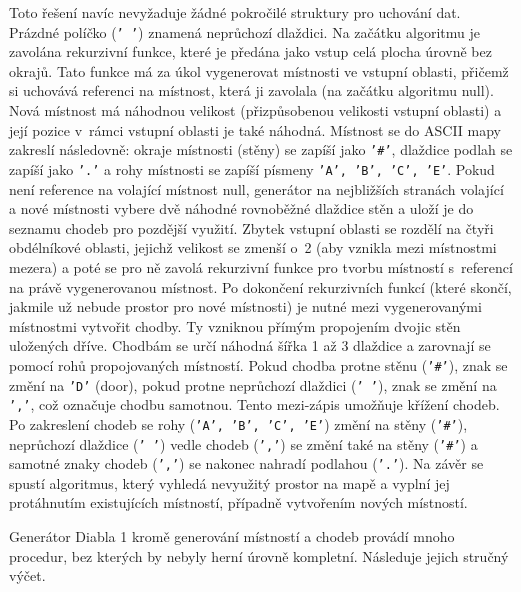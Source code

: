 Toto řešení navíc nevyžaduje žádné pokročilé struktury pro uchování dat.
Prázdné políčko (\texttt{' '}) znamená neprůchozí dlaždici.
Na začátku algoritmu je zavolána rekurzivní funkce, které je předána jako vstup celá plocha úrovně bez okrajů.
Tato funkce má za úkol vygenerovat místnosti ve vstupní oblasti, přičemž si uchovává referenci na místnost, která ji zavolala (na začátku algoritmu null).
Nová místnost má náhodnou velikost (přizpůsobenou velikosti vstupní oblasti) a její pozice v~rámci vstupní oblasti je také náhodná.
Místnost se do ASCII mapy zakreslí následovně: okraje místnosti (stěny) se zapíší jako \texttt{'\#'}, dlaždice podlah se zapíší jako \texttt{'.'} a rohy místnosti se zapíší písmeny \texttt{'A', 'B', 'C', 'E'}.
Pokud není reference na volající místnost null, generátor na nejbližších stranách volající a nové místnosti vybere dvě náhodné rovnoběžné dlaždice stěn a uloží je do seznamu chodeb pro pozdější využití.
Zbytek vstupní oblasti se rozdělí na čtyři obdélníkové oblasti, jejichž velikost se zmenší o~2 (aby vznikla mezi místnostmi mezera) a poté se pro ně zavolá rekurzivní funkce pro tvorbu místností s~referencí na právě vygenerovanou místnost.
Po dokončení rekurzivních funkcí (které skončí, jakmile už nebude prostor pro nové místnosti) je nutné mezi vygenerovanými místnostmi vytvořit chodby.
Ty vzniknou přímým propojením dvojic stěn uložených dříve.
Chodbám se určí náhodná šířka 1 až 3 dlaždice a zarovnají se pomocí rohů propojovaných místností.
Pokud chodba protne stěnu (\texttt{'\#'}), znak se změní na \texttt{'D'} (door), pokud protne neprůchozí dlaždici (\texttt{' '}), znak se změní na \texttt{','}, což označuje chodbu samotnou.
Tento mezi-zápis umožňuje křížení chodeb.
Po zakreslení chodeb se rohy (\texttt{'A', 'B', 'C', 'E'}) změní na stěny (\texttt{'\#'}), neprůchozí dlaždice (\texttt{' '}) vedle chodeb (\texttt{','}) se změní také na stěny (\texttt{'\#'}) a samotné znaky chodeb (\texttt{','}) se nakonec nahradí podlahou (\texttt{'.'}).
Na závěr se spustí algoritmus, který vyhledá nevyužitý prostor na mapě a vyplní jej protáhnutím existujících místností, případně vytvořením nových místností.
\par
Generátor Diabla 1 kromě generování místností a chodeb provádí mnoho procedur, bez kterých by nebyly herní úrovně kompletní.
Následuje jejich stručný výčet.
